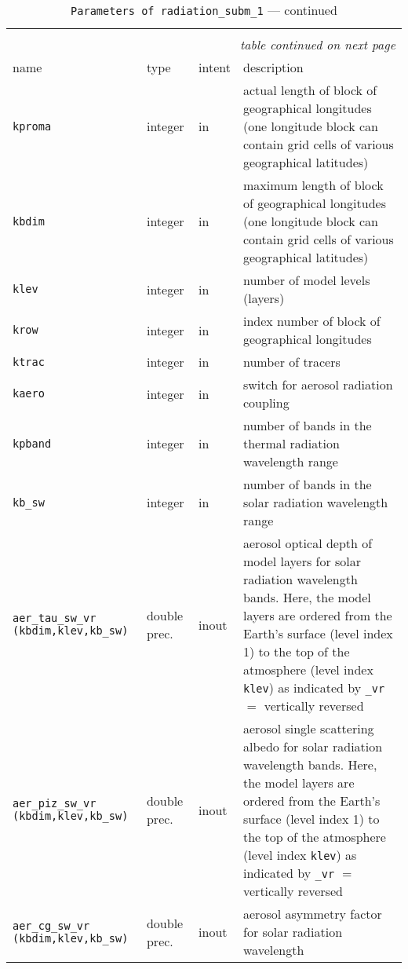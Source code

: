 \begin{longtable}{p{4.5cm}@{\extracolsep\fill}llp{7.0cm}}
\hline\hline\caption[Parameters of {\tt radiation\_subm\_1}]{Parameter list
  of arguments passed to {\tt radiation\_subm\_1}}\\\hline\label{tabpradiation_subm_1}
\endfirsthead
\caption[]{{\tt Parameters of {\tt radiation\_subm\_1}} --- continued}\\\hline
\endhead
\hline\multicolumn{4}{r}{\slshape table continued on next page}\\
\endfoot
\hline %
\endlastfoot
name & type & intent & description \\\hline
{\tt kproma} & integer & in & actual length of
block of geographical longitudes (one longitude block can contain grid
cells of various geographical latitudes)\\
{\tt kbdim} &  integer & in & maximum length of block of
geographical longitudes (one longitude block can contain grid cells of
various geographical latitudes)\\
{\tt klev} &  integer & in & number of model levels (layers)\\
{\tt krow} &  integer & in & index number of block of geographical 
longitudes\\
{\tt ktrac} &  integer & in & number of tracers \\
{\tt kaero} & integer & in & switch for aerosol radiation coupling\\
{\tt kpband} & integer & in & number of bands in the thermal radiation
wavelength range \\
{\tt kb\_sw} & integer & in & number of bands in the solar radiation
wavelength range \\
{\tt aer\_tau\_sw\_vr (kbdim,klev,kb\_sw)} & double prec. & inout &
aerosol optical depth of model layers for solar radiation wavelength
bands. Here, the model layers are ordered from the Earth's surface (level
index 1) to the
top of the atmosphere (level index {\tt klev}) as indicated by
{\tt \_vr} $=$ vertically reversed\\
{\tt aer\_piz\_sw\_vr (kbdim,klev,kb\_sw)} & double prec. & inout &
aerosol single scattering albedo for solar radiation wavelength
bands. Here, the model layers are ordered from the Earth's surface (level
index 1) to the
top of the atmosphere (level index {\tt klev}) as indicated by
{\tt \_vr} $=$ vertically reversed\\
{\tt aer\_cg\_sw\_vr (kbdim,klev,kb\_sw)} & double prec. & inout &
aerosol asymmetry factor for solar radiation wavelength

\end{longtable}
